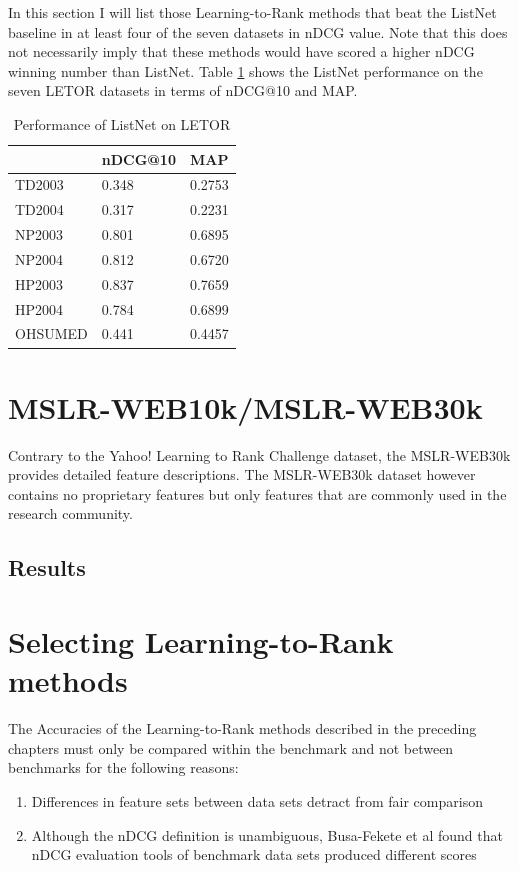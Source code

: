 In this section I will list those Learning-to-Rank methods that beat the ListNet baseline in at least four of the seven datasets in \ac{nDCG} value. Note that this does not necessarily imply that these methods would have scored a higher \ac{nDCG} winning number than ListNet. Table \ref{tbl:LETOR_ListNet} shows the ListNet performance on the seven LETOR datasets in terms of \ac{nDCG}@10 and \ac{MAP}.
\begin{table}
\begin{tabular}{l|ll}
 & \ac{nDCG}@10 & \ac{MAP} \\ 
 \hline
TD2003 & 0.348 & 0.2753 \\ 
TD2004 & 0.317 & 0.2231 \\ 
NP2003 & 0.801 & 0.6895 \\ 
NP2004 & 0.812 & 0.6720 \\ 
HP2003 & 0.837 & 0.7659 \\ 
HP2004 & 0.784 & 0.6899 \\ 
OHSUMED & 0.441 & 0.4457 \\ 
\end{tabular}
\caption{Performance of ListNet on LETOR}
\label{tbl:LETOR_ListNet}
\end{table}


\chapter{MSLR-WEB10k/MSLR-WEB30k}
Contrary to the Yahoo! Learning to Rank Challenge dataset, the MSLR-WEB30k provides detailed feature descriptions. The MSLR-WEB30k dataset however contains no proprietary features but only features that are commonly used in the research community.
\section{Results}

\chapter{Selecting Learning-to-Rank methods}
The Accuracies of the Learning-to-Rank methods described in the preceding chapters must only be compared within the benchmark and not between benchmarks for the following reasons:
\begin{enumerate}
\item Differences in feature sets between data sets detract from fair comparison
\item Although the \ac{nDCG} definition is unambiguous, Busa-Fekete et al\cite{Busa-Fekete2012} found that \ac{nDCG} evaluation tools of benchmark data sets produced different scores
\end{enumerate}